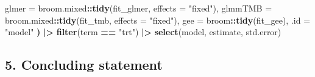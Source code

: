 \documentclass[
]{article}
\newenvironment{Shaded}{\begin{snugshade}}{\end{snugshade}}
\newcommand{\AttributeTok}[1]{\textcolor[rgb]{0.13,0.29,0.53}{#1}}
\newcommand{\DecValTok}[1]{\textcolor[rgb]{0.00,0.00,0.81}{#1}}
\newcommand{\ErrorTok}[1]{\textcolor[rgb]{0.64,0.00,0.00}{\textbf{#1}}}
\newcommand{\FunctionTok}[1]{\textcolor[rgb]{0.13,0.29,0.53}{\textbf{#1}}}
\newcommand{\NormalTok}[1]{#1}
\newcommand{\OtherTok}[1]{\textcolor[rgb]{0.56,0.35,0.01}{#1}}
\newcommand{\SpecialCharTok}[1]{\textcolor[rgb]{0.81,0.36,0.00}{\textbf{#1}}}
\newcommand{\StringTok}[1]{\textcolor[rgb]{0.31,0.60,0.02}{#1}}
\begin{document}
\begin{Shaded}
\end{Shaded}

\begin{Shaded}
\begin{Highlighting}[]
\NormalTok{  glmer   }\OtherTok{=}\NormalTok{ broom.mixed}\SpecialCharTok{::}\FunctionTok{tidy}\NormalTok{(fit\_glmer, }\AttributeTok{effects =} \StringTok{"fixed"}\NormalTok{),}
\NormalTok{  glmmTMB }\OtherTok{=}\NormalTok{ broom.mixed}\SpecialCharTok{::}\FunctionTok{tidy}\NormalTok{(fit\_tmb,   }\AttributeTok{effects =} \StringTok{"fixed"}\NormalTok{),}
\NormalTok{  gee     }\OtherTok{=}\NormalTok{ broom}\SpecialCharTok{::}\FunctionTok{tidy}\NormalTok{(fit\_gee),}
\NormalTok{  .id }\OtherTok{=} \StringTok{"model"}
\ErrorTok{)} \SpecialCharTok{|\textgreater{}}
  \FunctionTok{filter}\NormalTok{(term }\SpecialCharTok{==} \StringTok{"trt"}\NormalTok{) }\SpecialCharTok{|\textgreater{}}
  \FunctionTok{select}\NormalTok{(model, estimate, std.error)}
\end{Highlighting}
\end{Shaded}

\subsection{5. Concluding statement}\label{concluding-statement}
\end{document}
